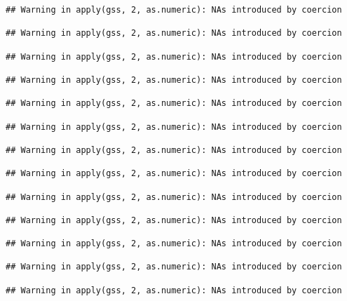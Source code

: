 \documentclass[
]{article}
\begin{document}
\begin{verbatim}
## Warning in apply(gss, 2, as.numeric): NAs introduced by coercion

## Warning in apply(gss, 2, as.numeric): NAs introduced by coercion

## Warning in apply(gss, 2, as.numeric): NAs introduced by coercion

## Warning in apply(gss, 2, as.numeric): NAs introduced by coercion

## Warning in apply(gss, 2, as.numeric): NAs introduced by coercion

## Warning in apply(gss, 2, as.numeric): NAs introduced by coercion

## Warning in apply(gss, 2, as.numeric): NAs introduced by coercion

## Warning in apply(gss, 2, as.numeric): NAs introduced by coercion

## Warning in apply(gss, 2, as.numeric): NAs introduced by coercion

## Warning in apply(gss, 2, as.numeric): NAs introduced by coercion

## Warning in apply(gss, 2, as.numeric): NAs introduced by coercion

## Warning in apply(gss, 2, as.numeric): NAs introduced by coercion

## Warning in apply(gss, 2, as.numeric): NAs introduced by coercion
\end{verbatim}
\end{document}
